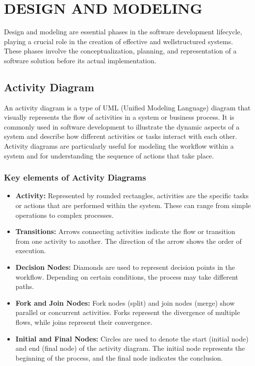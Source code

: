 \chapter{DESIGN AND MODELING}

Design and modeling are essential phases in the software development lifecycle, playing a
crucial role in the creation of effective and wellstructured systems. These phases involve
the conceptualization, planning, and representation of a software solution before its actual
implementation.
\section{Activity Diagram}
An activity diagram is a type of UML (Unified Modeling Language) diagram that visually represents the flow of activities in a system or business process. It is commonly used in software development to illustrate the dynamic aspects of a system and describe how different activities or tasks interact with each other. Activity diagrams are particularly useful for modeling the workflow within a system and for understanding the sequence of actions that take place.

\subsection{Key elements of Activity Diagrams}
\begin{itemize}
    \item \textbf{Activity:} Represented by rounded rectangles, activities are the specific tasks or actions that are performed within the system. These can range from simple operations to complex processes.
    \item \textbf{Transitions:} Arrows connecting activities indicate the flow or transition from one activity to another. The direction of the arrow shows the order of execution.
    \item \textbf{Decision Nodes:} Diamonds are used to represent decision points in the workflow. Depending on certain conditions, the process may take different paths.
    \item \textbf{Fork and Join Nodes:} Fork nodes (split) and join nodes (merge) show parallel or concurrent activities. Forks represent the divergence of multiple flows, while joins represent their convergence.
    \item \textbf{Initial and Final Nodes:} Circles are used to denote the start (initial node) and end (final node) of the activity diagram. The initial node represents the beginning of the process, and the final node indicates the conclusion.
\end{itemize}


